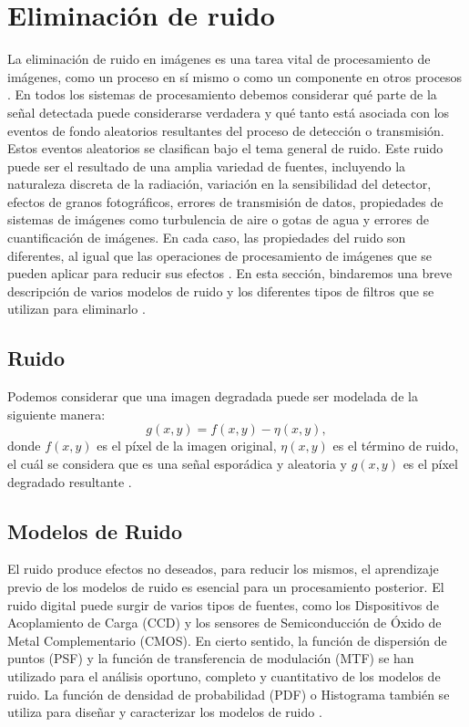 \section{Eliminación de ruido}

La eliminación de ruido en imágenes es una tarea vital de procesamiento de imágenes, como un proceso en sí mismo o como un componente en otros procesos \cite{PawanManojSumitAshok}. En todos los sistemas de procesamiento debemos considerar qué parte de la señal detectada puede considerarse verdadera y qué tanto está asociada con los eventos de fondo aleatorios resultantes del proceso de detección o transmisión. Estos eventos aleatorios se clasifican bajo el tema general de ruido. Este ruido puede ser el resultado de una amplia variedad de fuentes, incluyendo la naturaleza discreta de la radiación, variación en la sensibilidad del detector, efectos de granos fotográficos, errores de transmisión de datos, propiedades de sistemas de imágenes como turbulencia de aire o gotas de agua y errores de cuantificación de imágenes. En cada caso, las propiedades del ruido son diferentes, al igual que las operaciones de procesamiento de imágenes que se pueden aplicar para reducir sus efectos \cite{topic5}. En esta sección, bindaremos una breve descripción de varios modelos de ruido \cite{AjayBrijendra} y los diferentes tipos de filtros que se utilizan para eliminarlo \cite{MandarMeghana, PawanManojSumitAshok}.

\subsection{Ruido}

Podemos considerar que una imagen degradada puede ser modelada de la siguiente manera:
$$g(x, y) = f(x, y) - \eta(x, y),$$
donde $f(x, y)$ es el píxel de la imagen original, $\eta(x, y)$ es el término de ruido, el cuál se considera que es una señal esporádica y aleatoria y $g(x, y)$ es el píxel degradado resultante \cite{MandarMeghana}.

\subsection{Modelos de Ruido}

El ruido produce efectos no deseados, para reducir los mismos, el aprendizaje previo de los modelos de ruido es esencial para un procesamiento posterior. El ruido digital puede surgir de varios tipos de fuentes, como los Dispositivos de Acoplamiento de Carga (CCD) y los sensores de Semiconducción de Óxido de Metal Complementario (CMOS). En cierto sentido, la función de dispersión de puntos (PSF) y la función de transferencia de modulación (MTF) se han utilizado para el análisis oportuno, completo y cuantitativo de los modelos de ruido. La función de densidad de probabilidad (PDF) o Histograma también se utiliza para diseñar y caracterizar los modelos de ruido \cite{AjayBrijendra,Dougherty}.\\

